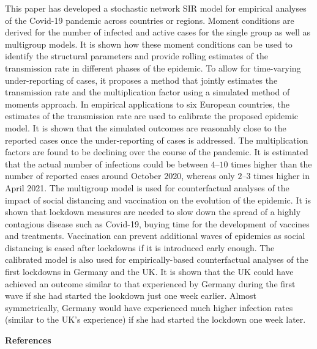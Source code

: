 \documentclass[12pt]{article}
\begin{document}
This paper has developed a stochastic network SIR model for empirical analyses
of the Covid-19 pandemic across countries or regions. Moment conditions are
derived for the number of infected and active cases for the single group as
well as multigroup models. It is shown how these moment conditions can be used
to identify the structural parameters and provide rolling estimates of the
transmission rate in different phases of the epidemic. To allow for
time-varying under-reporting of cases, it proposes a method that jointly
estimates the transmission rate and the multiplication factor using a
simulated method of moments approach. In empirical applications to six
European countries, the estimates of the transmission rate are used to
calibrate the proposed epidemic model. It is shown that the simulated outcomes
are reasonably close to the reported cases once the under-reporting of cases
is addressed. The multiplication factors are found to be declining over the
course of the pandemic. It is estimated that the actual number of infections
could be between $4$--$10$ times higher than the number of reported cases
around October 2020, whereas only $2$--$3$ times higher in April 2021. The
multigroup model is used for counterfactual analyses of the impact of social
distancing and vaccination on the evolution of the epidemic. It is shown that
lockdown measures are needed to slow down the spread of a highly contagious
disease such as Covid-19, buying time for the development of vaccines and
treatments. Vaccination can prevent additional waves of epidemics as social
distancing is eased after lockdowns if it is introduced early enough. The
calibrated model is also used for empirically-based counterfactual analyses of
the first lockdowns in Germany and the UK. It is shown that the UK could have
achieved an outcome similar to that experienced by Germany during the first
wave if she had started the lookdown just one week earlier. Almost
symmetrically, Germany would have experienced much higher infection rates
(similar to the UK's experience) if she had started the lockdown one week later.%

\vspace{0.3cm}%
%

\noindent\large
\textbf{References}%
\end{document}

